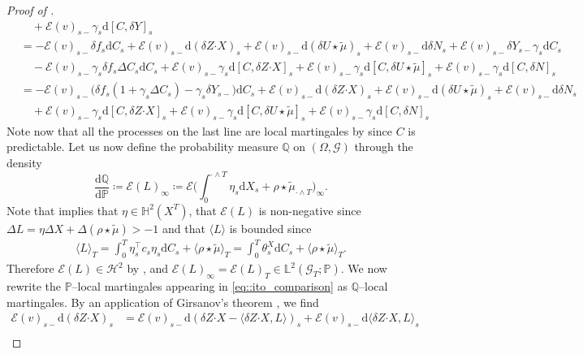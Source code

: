 \documentclass[10pt]{article} %
\newcommand\cE{\mathcal E}
\newcommand\cG{\mathcal G}
\newcommand\cH{\mathcal H}
\def \H{\mathbb{H}}
\def \L{\mathbb{L}}
\def \P{\mathbb{P}}
\def \Q{\mathbb{Q}}
\newcommand{\bcdot}{\boldsymbol{\cdot}}
\newcommand{\1}{\mathbf{1}}
\def\d{\mathrm{d}}
\begin{document}
\begin{proof}[Proof of ]
\begin{align}
		&\quad + \cE(v)_{s-}\gamma_s\d [C,\delta Y]_s \nonumber\\
		&= -\cE(v)_{s-} \delta f_s \d C_s + \cE(v)_{s-} \d(\delta Z \bcdot X)_s + \cE(v)_{s-}\d (\delta U \star\tilde\mu)_s + \cE(v)_{s-}\d \delta N_s + \cE(v)_{s-}\delta Y_{s-}\gamma_s\d C_s \nonumber\\
		&\quad - \cE(v)_{s-}\gamma_s\delta f_s \Delta C_s \d C_s + \cE(v)_{s-}\gamma_s \d [C,\delta Z \bcdot X]_s + \cE(v)_{s-}\gamma_s \d [C,\delta U \star\tilde\mu]_s + \cE(v)_{s-}\gamma_s \d [C,\delta N]_s \nonumber\\
		&= - \cE(v)_{s-} \big(\delta f_s(1+\gamma_s\Delta C_s) - \gamma_s\delta Y_{s-}\big)\d C_s + \cE(v)_{s-} \d(\delta Z \bcdot X)_s + \cE(v)_{s-}\d (\delta U \star\tilde\mu)_s + \cE(v)_{s-}\d \delta N_s \nonumber\\
		&\quad + \cE(v)_{s-}\gamma_s \d [C,\delta Z \bcdot X]_s + \cE(v)_{s-}\gamma_s \d [C,\delta U \star\tilde\mu]_s + \cE(v)_{s-}\gamma_s \d [C,\delta N]_s
	\end{align}
	Note now that all the processes on the last line are local martingales by \cite[Proposition I.4.49.(c)]{jacod2003limit} since $C$ is predictable. Let us now define the probability measure $\Q$ on $(\Omega,\cG)$ through the density
	\begin{equation}\label{eq::stoch_exp_measure_change}
		\frac{\d\Q}{\d\P} \coloneqq \cE(L)_\infty \coloneqq \cE\bigg(\int_0^{\cdot \land T}\eta_s\d X_s + \rho \star \tilde\mu_{\cdot \land T}\bigg)_\infty.
	\end{equation}
	Note that  implies that $\eta \in \H^2(X^T)$, that $\cE(L)$ is non-negative since $\Delta L = \eta \Delta X + \Delta (\rho\star\tilde\mu) > -1$ and that $\langle L \rangle$ is bounded since
	\begin{align*}
		\langle L \rangle_T = \int_0^T \eta^\top_s c_s \eta_s \d C_s + \langle \rho\star\tilde\mu\rangle_T = \int_0^T \theta^X_s \d C_s + \langle \rho\star\tilde\mu\rangle_T.
	\end{align*}
	Therefore $\cE(L) \in \cH^2$ by , and $\cE(L)_\infty = \cE(L)_T \in \L^2(\cG_T;\P)$. We now rewrite the $\P$--local martingales appearing in \eqref{eq::ito_comparison} as $\Q$--local martingales. By an application of Girsanov's theorem \cite[Proposition 7.25 and 7.26]{jacod1979calcul}, we find
	\begingroup
	\allowdisplaybreaks
	\begin{align*}
		\cE(v)_{s-} \d (\delta Z \bcdot X)_s 
		&= \cE(v)_{s-}\d (\delta Z\bcdot X - \langle \delta Z \bcdot X,L \rangle)_s + \cE(v)_{s-}\d\langle \delta Z \bcdot X,L \rangle_s \\

\end{align*}
\end{proof}
\end{document}
